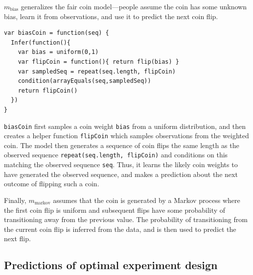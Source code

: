 \documentclass{article}
\begin{document}
$m_{\text{bias}}$ generalizes the fair coin model---people assume the coin has some unknown bias, learn it from observations, and use it to predict the next coin flip.
\begin{lstlisting}[upquote=true]
var biasCoin = function(seq) {
  Infer(function(){
    var bias = uniform(0,1)
    var flipCoin = function(){ return flip(bias) }
    var sampledSeq = repeat(seq.length, flipCoin)
    condition(arrayEquals(seq,sampledSeq))
    return flipCoin()
  })
}
\end{lstlisting}
\lstinline{biasCoin} first samples a coin weight \lstinline{bias} from a uniform distribution, and
then creates a helper function \lstinline{flipCoin} which samples observations from the weighted coin.
The model then generates a sequence of coin flips the same length as the observed sequence \lstinline{repeat(seq.length, flipCoin)} and conditions on this matching the observed sequence \lstinline{seq}.
Thus, it learns the likely coin weights to have generated the observed sequence, and makes a prediction about the next outcome of flipping such a coin.

Finally, $m_{\text{markov}}$ assumes that the coin is generated by a Markov process where the first coin flip is uniform and subsequent flips have some probability of transitioning away from the previous value.
The probability of transitioning from the current coin flip is inferred from the data, and is then used to predict the next flip.


\subsection{Predictions of optimal experiment design}
\end{document}
